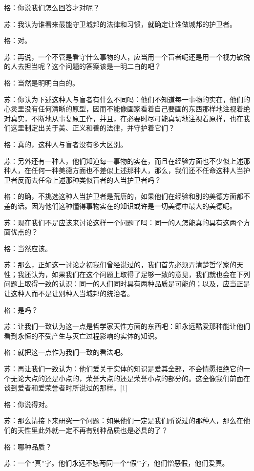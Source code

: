 \documentclass[12pt,oneside]{book}
\begin{document}
格：你说我们怎么回答才对呢？

苏：我认为谁看来最能守卫城邦的法律和习惯，就确定让谁做城邦的护卫者。

格：对。

苏：再说，一个不管是看守什么事物的人，应当用一个盲者呢还是用一个视力敏锐的人去担当呢？这个问题的答案该是一明二白的吧？

格：当然是明明白白的。

苏：你认为下述这种人与盲者有什么不同吗：他们不知道每一事物的实在，他们的心灵里没有任何清晰的原型，因而不能像画家看着自己要画的东西那样地注视着绝对真实，不断地从事复原工作，并且，在必要时尽可能真切地注视着原样，也在我们这里制定出关于美、正义和善的法律，并守护着它们？

格：真的，这种人与盲者没有多大区别。

苏：另外还有一种人，他们知道每一事物的实在，而且在经验方面也不少似上述那种人，在任何一种美德方面也不差似上述那种人，那么，我们还不任命这种人当护卫者反而去任命上述那种类似盲者的人当护卫者吗？

格：的确，不挑选这种人当护卫者是荒唐的，如果他们在经验和别的美德方面都不差的话。因为他们这种懂得事物实在的知识或许是一切美德中最大的美德呢。

苏：现在我们不是应该来讨论这样一个问题了吗：同一的人怎能真的具有这两个方面优点的？

格：当然应该。

苏：那么，正如这一讨论之初我们曾经说过的，我们首先必须弄清楚哲学家的天性；我还认为，如果我们在这个问题上取得了足够一致的意见，我们就也会在下列问题上取得一致的认识：同一的人们同时具有两种品质是可能的；以及，应当正是让这种人而不是让别种人当城邦的统治者。

格：是吗？

苏：让我们一致认为这一点是哲学家天性方面的东西吧：即永远酷爱那种能让他们看到永恒的不受产生与灭亡过程影响的实体的知识。

格：就把这一点作为我们一致的看法吧。

苏：再让我们一致认为：他们爱关于实体的知识是爱其全部，不会情愿拒绝它的一个无论大点的还是小点的，荣誉大点的还是荣誉小点的部分的。这全像我们前面在谈到爱者和爱荣誉者时所说过的那样。[1]

格：你说得对。

苏：那么请接下来研究一个问题：如果他们一定是我们所说过的那种人，那么在他们的天性里此外就一定不再有别种品质也是必具的了？

格：哪种品质？

苏：一个“真”字。他们永远不愿苟同一个“假”字，他们憎恶假，他们爱真。
\end{document}
